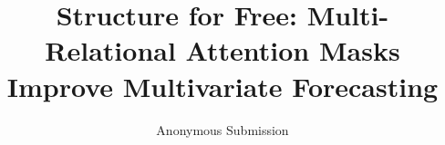\documentclass[letterpaper]{article}   %
\begin{document}
\title{Structure for Free: Multi-Relational Attention Masks Improve Multivariate Forecasting}

\author{
    Anonymous Submission
}

\maketitle

\end{document}
